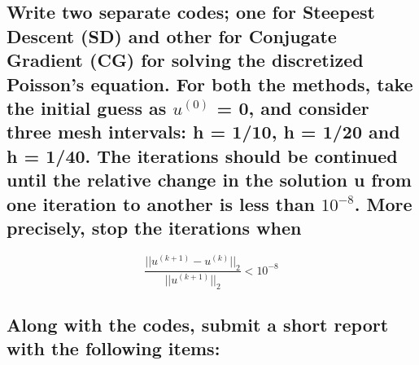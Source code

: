 \documentclass[11pt]{article}
\begin{document}
    \hypertarget{write-two-separate-codes-one-for-steepest-descent-sd-and-other-for-conjugate-gradient-cg-for-solving-the-discretized-poissons-equation.-for-both-the-methods-take-the-initial-guess-as-u0-0-and-consider-three-mesh-intervals-h-110-h-120-and-h-140.-the-iterations-should-be-continued-until-the-relative-change-in-the-solution-u-from-one-iteration-to-another-is-less-than-10-8.-more-precisely-stop-the-iterations-when}{%
\subsection{\texorpdfstring{Write two separate codes; one for Steepest
Descent (SD) and other for Conjugate Gradient (CG) for solving the
discretized Poisson's equation. For both the methods, take the initial
guess as \(u^{(0)}\) = 0, and consider three mesh intervals: h = 1/10, h
= 1/20 and h = 1/40. The iterations should be continued until the
relative change in the solution u from one iteration to another is less
than \(10^{-8}\). More precisely, stop the iterations
when}{Write two separate codes; one for Steepest Descent (SD) and other for Conjugate Gradient (CG) for solving the discretized Poisson's equation. For both the methods, take the initial guess as u\^{}\{(0)\} = 0, and consider three mesh intervals: h = 1/10, h = 1/20 and h = 1/40. The iterations should be continued until the relative change in the solution u from one iteration to another is less than 10\^{}\{-8\}. More precisely, stop the iterations when}}\label{write-two-separate-codes-one-for-steepest-descent-sd-and-other-for-conjugate-gradient-cg-for-solving-the-discretized-poissons-equation.-for-both-the-methods-take-the-initial-guess-as-u0-0-and-consider-three-mesh-intervals-h-110-h-120-and-h-140.-the-iterations-should-be-continued-until-the-relative-change-in-the-solution-u-from-one-iteration-to-another-is-less-than-10-8.-more-precisely-stop-the-iterations-when}}

    \[\frac{||u^{(k+1)}-u^{(k)}||_2}{||u^{(k+1)}||_2} < 10^{-8} \tag{3}\]

    \hypertarget{along-with-the-codes-submit-a-short-report-with-the-following-items}{%
\subsection{Along with the codes, submit a short report with the
following
items:}\label{along-with-the-codes-submit-a-short-report-with-the-following-items}}
\end{document}
